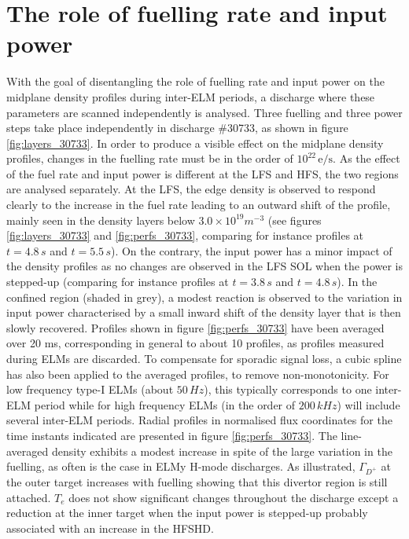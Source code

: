 \documentclass[12pt]{iopart}
\begin{document}
\section{The role of fuelling rate and input power}
\label{sec:fuel_power}

With the goal of disentangling the role of fuelling rate and input power on the midplane density profiles during inter-ELM periods, a discharge where these parameters are scanned independently is analysed. Three fuelling and three power steps take place independently in discharge \#30733, as shown in figure \ref{fig:layers_30733}. In order to produce a visible effect on the midplane density profiles, changes in the fuelling rate must be in the order of $\mathrm{10^{22}\,e/s}$. As the effect of the fuel rate and input power is different at the LFS and HFS, the two regions are analysed separately. At the LFS, the edge density is observed to respond clearly to the increase in the fuel rate leading to an outward shift of the profile, mainly seen in the density layers below $3.0\times10^{19}m^{-3}$ (see figures \ref{fig:layers_30733} and \ref{fig:perfs_30733}, comparing for instance profiles at $t=4.8\,s$ and $t=5.5\,s$). On the contrary, the input power has a minor impact of the density profiles as no changes are observed in the LFS SOL when the power is stepped-up (comparing for instance profiles at $t=3.8\,s$ and $t=4.8\,s$). In the confined region (shaded in grey), a modest reaction is observed to the variation in input power characterised by a small inward shift of the density layer that is then slowly recovered. Profiles shown in figure \ref{fig:perfs_30733} have been averaged over 20 ms, corresponding in general to about 10 profiles, as profiles measured during ELMs are discarded. To compensate for sporadic signal loss, a cubic spline has also been applied to the averaged profiles, to remove non-monotonicity. For low frequency type-I ELMs (about $50\,Hz$), this typically corresponds to one inter-ELM period while for high frequency ELMs (in the order of $200\,kHz$) will include several inter-ELM periods. Radial profiles in normalised flux coordinates for the time instants indicated are presented in figure \ref{fig:perfs_30733}. The line-averaged density exhibits a modest increase in spite of the large variation in the fuelling, as often is the case in ELMy H-mode discharges. As illustrated, $\Gamma_{D^{+}}$ at the outer target increases with fuelling showing that this divertor region is still attached. $T_e$ does not show significant changes throughout the discharge except a reduction at the inner target when the input power is stepped-up probably associated with an increase in the HFSHD.
\end{document}
